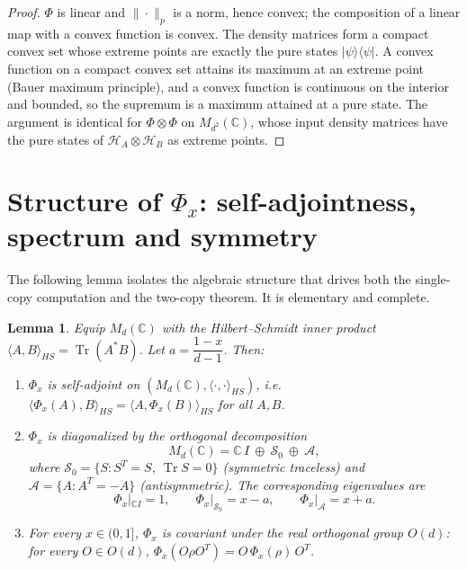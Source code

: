 \documentclass{amsart}
\newtheorem{lemma}{Lemma}
\theoremstyle{definition}
\DeclareMathOperator{\Tr}{Tr}
\newcommand{\HH}{\mathcal{H}}
\begin{document}
\begin{proof}
$\Phi$ is linear and $\|\cdot\|_p$ is a norm, hence convex; the composition of a
linear map with a convex function is convex. The density matrices form a compact
convex set whose extreme points are exactly the pure states
$|\psi\rangle\langle\psi|$. A convex function on a compact convex set attains its
maximum at an extreme point (Bauer maximum principle), and a convex function is
continuous on the interior and bounded, so the supremum is a maximum attained at
a pure state. The argument is identical for $\Phi\otimes\Phi$ on
$M_{d^2}(\mathbb C)$, whose input density matrices have the pure states of
$\HH_A\otimes\HH_B$ as extreme points.
\end{proof}

\section{Structure of $\Phi_x$: self-adjointness, spectrum and symmetry}
\label{sec:struct}

The following lemma isolates the algebraic structure that drives both the
single-copy computation and the two-copy theorem. It is elementary and complete.

\begin{lemma}\label{lem:struct}
Equip $M_d(\mathbb C)$ with the Hilbert--Schmidt inner product
$\langle A,B\rangle_{HS}=\Tr(A^{*}B)$. Let $a=\dfrac{1-x}{d-1}$. Then:
\begin{enumerate}
\item[(i)] $\Phi_x$ is self-adjoint on $(M_d(\mathbb C),\langle\cdot,\cdot
\rangle_{HS})$, i.e. $\langle\Phi_x(A),B\rangle_{HS}
=\langle A,\Phi_x(B)\rangle_{HS}$ for all $A,B$.
\item[(ii)] $\Phi_x$ is diagonalized by the orthogonal decomposition
\[
M_d(\mathbb C)=\mathbb C\,I\ \oplus\ \mathcal S_0\ \oplus\ \mathcal A,
\]
where $\mathcal S_0=\{S:S^{T}=S,\ \Tr S=0\}$ (symmetric traceless) and
$\mathcal A=\{A:A^{T}=-A\}$ (antisymmetric). The corresponding eigenvalues are
\[
\Phi_x|_{\mathbb C I}=1,\qquad
\Phi_x|_{\mathcal S_0}=x-a,\qquad
\Phi_x|_{\mathcal A}=x+a .
\]
\item[(iii)] For every $x\in(0,1]$, $\Phi_x$ is covariant under the real
orthogonal group $O(d)$: for every $O\in O(d)$,
$\Phi_x(O\rho O^{T})=O\,\Phi_x(\rho)\,O^{T}$.
\end{enumerate}
\end{lemma}
\end{document}
